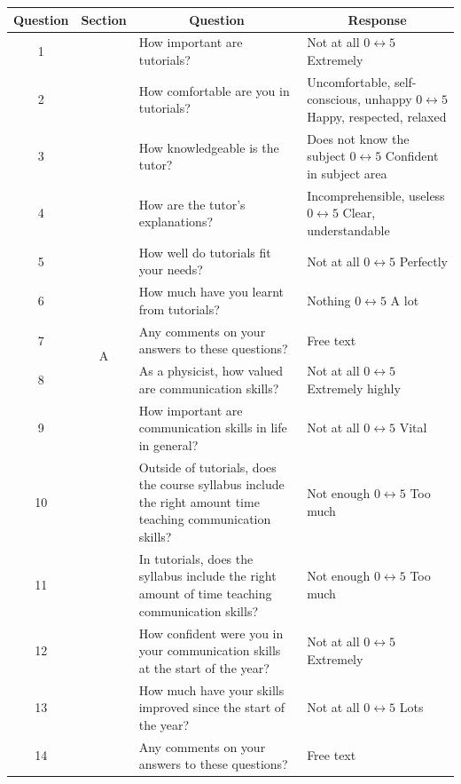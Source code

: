 \begin{table}\scriptsize
\centering
\begin{tabular}{c c p{2in} p{2in}}
\toprule
\multicolumn{1}{c}{Question} & \multicolumn{1}{c}{Section} & \multicolumn{1}{c}{Question} & \multicolumn{1}{c}{Response} \\
\midrule 
\hphantom{0}1 & \multirow{12}{*}{A} & How important are tutorials? & Not at all $0 \leftrightarrow 5$ Extremely \\
\hphantom{0}2 &		& How comfortable are you in tutorials? & Uncomfortable, self-conscious, unhappy $0 \leftrightarrow 5$ Happy, respected, relaxed \\
\hphantom{0}3 & 	& How knowledgeable is the tutor? & Does not know the subject $0 \leftrightarrow 5$ Confident in subject area \\
\hphantom{0}4 &		& How are the tutor's explanations? & Incomprehensible, useless $0 \leftrightarrow 5$ Clear, understandable \\
\hphantom{0}5 & 	& How well do tutorials fit your needs? & Not at all $0 \leftrightarrow 5$ Perfectly \\
\hphantom{0}6 & 	& How much have you learnt from tutorials? & Nothing $0 \leftrightarrow 5$ A lot \\
\hphantom{0}7 &		& Any comments on your answers to these questions? & Free text \\
\midrule
\hphantom{0}8 & \multirow{16}{*}{B} & As a physicist, how valued are communication skills? & Not at all $0 \leftrightarrow 5$ Extremely highly \\
\hphantom{0}9 &	& How important are communication skills in life in general? & Not at all $0 \leftrightarrow 5$ Vital \\
10 &	& Outside of tutorials, does the course syllabus include the right amount time teaching communication skills? & Not enough $0 \leftrightarrow 5$ Too much \\
11 & 	& In tutorials, does the syllabus include the right amount of time teaching communication skills? & Not enough $0 \leftrightarrow 5$ Too much \\
12 & 	& How confident were you in your communication skills at the start of the year? & Not at all $0 \leftrightarrow 5$ Extremely \\
13 &	& How much have your skills improved since the start of the year? & Not at all $0 \leftrightarrow 5$ Lots \\
14 &	& Any comments on your answers to these questions? & Free text \\

\end{tabular}
\end{table}
